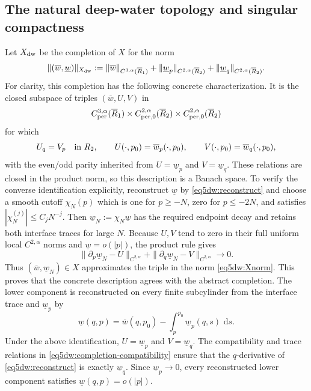 \documentclass[11pt,reqno]{amsart}
\numberwithin{equation}{section}
\newcommand{\dd}{\,\mathrm{d}}
\theoremstyle{definition}
\theoremstyle{remark}
\begin{document}
\subsection{The natural deep-water topology and singular compactness}

Let $X_{\rm dw}$ be the completion of $X$ for the norm
\begin{equation}\label{eq5dw:Xnorm}
 \|(\overline w,\underline w)\|_{X_{\rm dw}}
 :=\|\overline w\|_{C^{3,\alpha}(\overline R_1)}
 +\|\underline w_p\|_{C^{2,\alpha}(\overline R_2)}
 +\|\underline w_q\|_{C^{2,\alpha}(\overline R_2)}.
\end{equation}
For clarity, this completion has the following concrete
characterization.  It is the closed subspace of triples
$(\overline w,U,V)$ in
\[
 C^{3,\alpha}_{\rm per}(\overline R_1)
 \times C^{2,\alpha}_{\rm per,0}(\overline R_2)
 \times C^{2,\alpha}_{\rm per,0}(\overline R_2)
\]
for which
\begin{equation}\label{eq5dw:completion-compatibility}
 U_q=V_p\quad\hbox{in }R_2,\qquad
 U(\cdot,p_0)=\overline w_p(\cdot,p_0),\qquad
 V(\cdot,p_0)=\overline w_q(\cdot,p_0),
\end{equation}
with the even/odd parity inherited from
$U=\underline w_p$ and $V=\underline w_q$.  These relations are
closed in the product norm, so this description is a Banach space.
To verify the converse identification explicitly, reconstruct
$\underline w$ by \eqref{eq5dw:reconstruct} and choose a smooth
cutoff $\chi_N(p)$ which is one for $p\ge-N$, zero for $p\le-2N$,
and satisfies $|\chi_N^{(j)}|\le C_jN^{-j}$.  Then
$\underline w_N:=\chi_N\underline w$ has the required endpoint
decay and retains both interface traces for large $N$.  Because
$U,V$ tend to zero in their full uniform local $C^{2,\alpha}$ norms
and $\underline w=o(|p|)$, the product rule gives
\[
 \|\partial_p\underline w_N-U\|_{C^{2,\alpha}}
 +\|\partial_q\underline w_N-V\|_{C^{2,\alpha}}
 \longrightarrow0.
\]
Thus $(\overline w,\underline w_N)\in X$ approximates the triple in
the norm \eqref{eq5dw:Xnorm}.  This proves that the concrete
description agrees with the abstract completion.
The lower component is reconstructed on every finite subcylinder from
the interface trace and $\underline w_p$ by
\begin{equation}\label{eq5dw:reconstruct}
 \underline w(q,p)=\overline w(q,p_0)
 -\int_p^{p_0}\underline w_p(q,s)\,\dd s.
\end{equation}
Under the above identification, $U=\underline w_p$ and
$V=\underline w_q$.  The compatibility and trace relations in
\eqref{eq5dw:completion-compatibility} ensure that the $q$-derivative
of \eqref{eq5dw:reconstruct} is exactly $\underline w_q$.  Since
$\underline w_p\to0$, every reconstructed
lower component satisfies $\underline w(q,p)=o(|p|)$.
\end{document}
